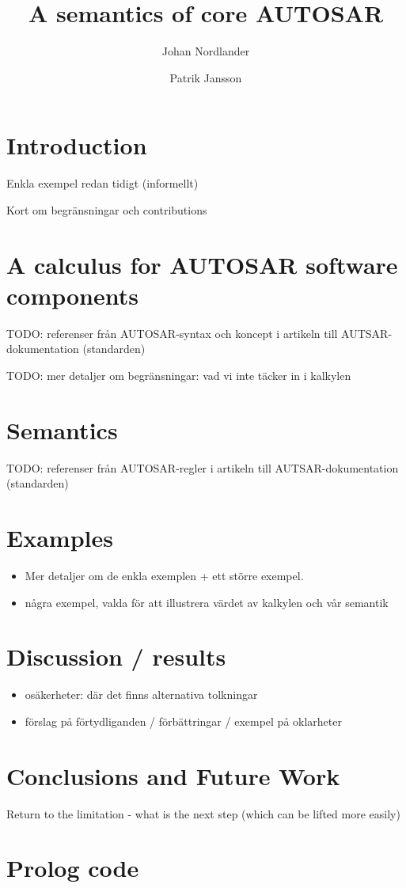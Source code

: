 \documentclass[twocolumn]{article}
\title{A semantics of core AUTOSAR}
\author{Johan Nordlander \and Patrik Jansson}
\begin{document}
\maketitle
\begin{abstract}
  
\end{abstract}

\section{Introduction}
\label{sec:Intro}

Enkla exempel redan tidigt (informellt)

Kort om begränsningar och contributions

\section{A calculus for AUTOSAR software components}
\label{sec:Calc}

TODO: referenser från AUTOSAR-syntax och koncept i artikeln till AUTSAR-dokumentation (standarden)

TODO: mer detaljer om begränsningar: vad vi inte täcker in i kalkylen

\section{Semantics}
\label{sec:Sem}

TODO: referenser från AUTOSAR-regler i artikeln till AUTSAR-dokumentation (standarden)

\section{Examples}
\label{sec:Examples}

\begin{itemize}
\item Mer detaljer om de enkla exemplen + ett större exempel.
\item några exempel, valda för att illustrera värdet av kalkylen och vår semantik
\end{itemize}

\section{Discussion / results}
\label{sec:Disc}

\begin{itemize}
\item osäkerheter: där det finns alternativa tolkningar
\item förslag på förtydliganden / förbättringar / exempel på oklarheter
\end{itemize}

\section{Conclusions and Future Work}
\label{sec:Conc}

Return to the limitation - what is the next step (which can be lifted more easily) 

\onecolumn
\appendix
\section{Prolog code}
\label{sec:Prolog}



\end{document}
